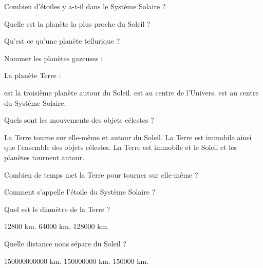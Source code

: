 
\begin{questions}
\question[2] Combien d'étoiles y a-t-il dans le Système Solaire ?
\fillwithdottedlines{1.5cm}

\question[2] Quelle est la planète la plus proche du Soleil ?
\fillwithdottedlines{1.5cm}

\question[2] Qu'est ce qu'une planète tellurique ?\
\fillwithdottedlines{1.5cm}


\question[2] Nommer les planètes gazeuses :
\fillwithdottedlines{2cm}


\question[2] La planète Terre :
\begin{checkboxes}
	\correctchoice est la troisième planète autour du Soleil.
	\choice est au centre de l'Univers.
	\choice est au centre du Système Solaire.\\ 
\end{checkboxes}


\question[2] Quels sont les mouvements des objets célestes ?
\begin{checkboxes}
	
	\correctchoice La Terre tourne sur elle-même et autour du Soleil.
	\choice La Terre est immobile ainsi que l'ensemble des objets célestes.
	\choice La Terre est immobile et le Soleil et les planètes tournent autour.\\	 
\end{checkboxes}

\newpage

\question[2] Combien de temps met la Terre pour tourner sur elle-même ?
\fillwithdottedlines{1.5cm}

\question[2] Comment s'appelle l'étoile du Système Solaire ?
\fillwithdottedlines{1.5cm}


\question[2] Quel est le diamètre de la Terre ?\\ 
\begin{oneparcheckboxes}
	\correctchoice \num{12800} km.
	\choice \num{64000} km.
	\choice \num{128000} km.
\end{oneparcheckboxes}


\question[2] Quelle distance nous sépare du Soleil ?\\
\begin{oneparcheckboxes}
	\choice \num{150000000000} km.
	\correctchoice \num{150000000} km.
	\choice \num{150000} km.
\end{oneparcheckboxes}\\


\end{questions}

